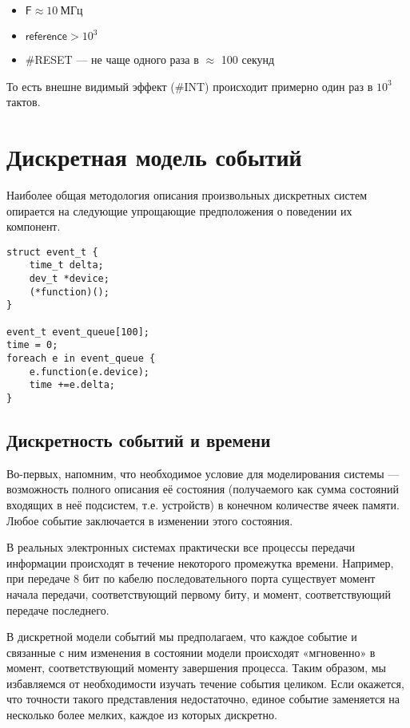 \begin{itemize}
    \item $\mathsf{F} \approx 10\ \text{МГц}$
    \item $\mathsf{reference} > 10^3$
    \item \#RESET — не чаще одного раза в $\approx$ 100 секунд
\end{itemize}

То есть внешне видимый эффект (\#INT) происходит примерно один раз в $10^3$ тактов.


\section{Дискретная модель событий}

Наиболее общая методология описания произвольных дискретных систем опирается на следующие упрощающие предположения о поведении их компонент.

\begin{lstlisting}
struct event_t {
    time_t delta;
    dev_t *device;
    (*function)();
}

event_t event_queue[100];
time = 0;
foreach e in event_queue {
    e.function(e.device);
    time +=e.delta;
}
\end{lstlisting}



\subsection{Дискретность событий и времени}

Во-первых, напомним, что необходимое условие для моделирования системы --- возможность полного описания её состояния (получаемого как сумма состояний входящих в неё подсистем, т.е. устройств) в конечном количестве ячеек памяти. Любое событие заключается в изменении этого состояния.

В реальных электронных системах практически все процессы передачи информации происходят в течение некоторого промежутка времени. Например, при передаче 8 бит по кабелю последовательного порта существует момент начала передачи, соответствующий первому биту, и момент, соответствующий передаче последнего.

В дискретной модели событий мы предполагаем, что каждое событие и связанные с ним изменения в состоянии модели происходят «мгновенно» в момент, соответствующий моменту завершения процесса. Таким образом, мы избавляемся от необходимости изучать течение события целиком. Если окажется, что точности такого представления недостаточно, единое событие заменяется на несколько более мелких, каждое из которых дискретно.

